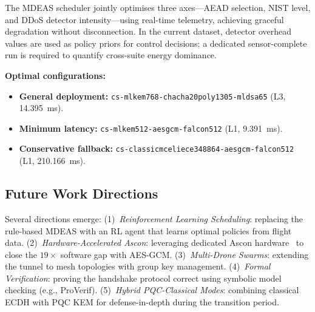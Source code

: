 \documentclass[conference]{IEEEtran}
\begin{document}
The MDEAS scheduler jointly optimises three axes---AEAD selection, NIST level, and DDoS detector intensity---using real-time telemetry, achieving graceful degradation without disconnection.
In the current dataset, detector overhead values are used as policy priors for control decisions; a dedicated sensor-complete run is required to quantify cross-suite energy dominance.

\textbf{Optimal configurations:}
\begin{itemize}[noitemsep]
    \item \textbf{General deployment:} {\small\texttt{cs-mlkem768-\hspace{0pt}chacha20poly1305-mldsa65}} (L3, \SI{14.395}{\milli\second}).
    \item \textbf{Minimum latency:} {\small\texttt{cs-mlkem512-aesgcm-falcon512}} (L1, \SI{9.391}{\milli\second}).
    \item \textbf{Conservative fallback:} {\small\texttt{cs-classicmceliece348864-\hspace{0pt}aesgcm-falcon512}} (L1, \SI{210.166}{\milli\second}).
\end{itemize}

\subsection{Future Work Directions}

Several directions emerge:
(1)~\emph{Reinforcement Learning Scheduling}: replacing the rule-based MDEAS with an RL agent that learns optimal policies from flight data.
(2)~\emph{Hardware-Accelerated Ascon}: leveraging dedicated Ascon hardware~\cite{ascon} to close the $19\times$ software gap with AES-GCM.
(3)~\emph{Multi-Drone Swarms}: extending the tunnel to mesh topologies with group key management.
(4)~\emph{Formal Verification}: proving the handshake protocol correct using symbolic model checking (e.g., ProVerif).
(5)~\emph{Hybrid PQC-Classical Modes}: combining classical ECDH with PQC KEM for defense-in-depth during the transition period.
\end{document}
